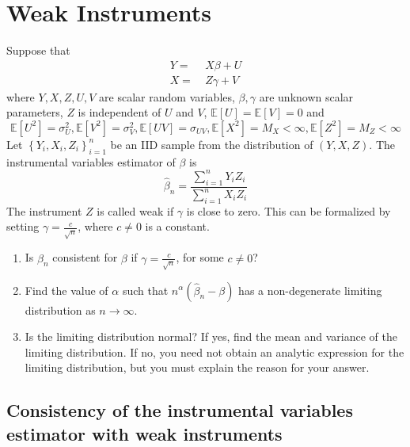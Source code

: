 \section{Weak Instruments}
Suppose that
\begin{align*}
  Y = & \ X \beta + U \\
  X = & \ Z \gamma + V
\end{align*}
where \(Y, X, Z, U, V\) are scalar random variables, \(\beta, \gamma\) are
unknown scalar parameters, \(Z\) is independent of \(U\) and \(V\), \(\mathbb{E}
[U] = \mathbb{E} [V] = 0\) and
\[
  \mathbb{E} \left[ U^{2} \right] = \sigma_{U}^{2}, \mathbb{E} \left[ V^{2}
  \right] = \sigma_{V}^{2}, \mathbb{E} [U V] = \sigma_{U V}, \mathbb{E} \left[
  X^{2} \right] = M_{X} < \infty, \mathbb{E} \left[Z^{2} \right] = M_{Z} <
  \infty
\]
Let \(\left\{ Y_{i}, X_{i}, Z_{i} \right\}_{i = 1}^{n}\) be an IID sample from
the distribution of \((Y, X, Z)\). The instrumental variables estimator of
\(\beta\) is
\[
  \widehat{\beta}_{n} = \frac{\sum_{i = 1}^{n} Y_{i} Z_{i}}{\sum_{i = 1}^{n}
  X_{i} Z_{i}}
\]
The instrument \(Z\) is called weak if \(\gamma\) is close to zero. This can be
formalized by setting \(\gamma = \frac{c}{\sqrt{n}}\), where \(c \neq 0\) is a
constant.
\begin{enumerate}
  \item Is \(\widehat{\beta}_{n}\) consistent for \(\beta\) if \(\gamma =
  \frac{c}{\sqrt{n}}\), for some \(c \neq 0\)?
  \item Find the value of \(\alpha\) such that \(n^{\alpha} \left(
    \widehat{\beta}_{n} -  \beta \right)\) has a non-degenerate limiting
  distribution as \(n \to \infty\).
  \item Is the limiting distribution normal? If yes, find the mean and variance
  of the limiting distribution. If no, you need not obtain an analytic
  expression for the limiting distribution, but you must explain the reason for
  your answer.
\end{enumerate}

\subsection{Consistency of the instrumental variables estimator with weak
instruments}

